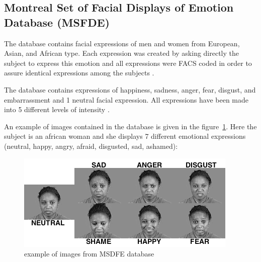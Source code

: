 \subsection{Montreal Set of Facial Displays of Emotion Database (MSFDE)}

\vspace{\baselineskip}
\noindent The database contains facial expressions of men and women from European, Asian, and African type. Each expression was created by asking directly the subject to express this emotion and all expressions were FACS coded in order to assure identical expressions among the subjects \cite{MSFDE}.
\newline

\noindent The database contains expressions of happiness, sadness, anger, fear, disgust, and embarrassment and 1 neutral facial expression. All expressions have been made into 5 different levels of intensity \cite{MSFDE}.
\newline

\noindent An example of images contained in the database is given in the figure~\ref{msfde_7facialexpressions}. Here the subject is an african woman and she displays 7 different emotional expressions (neutral, happy, angry, afraid, disgusted, sad, ashamed): 
\newline

\begin{figure}[!h]
\begin{center}
\noindent \includegraphics[scale=0.8]{figures/msfde_7facialexpressions} 
\newline
\caption{example of images from MSDFE database}
\label{msfde_7facialexpressions}
\end{center} 
\end{figure}






